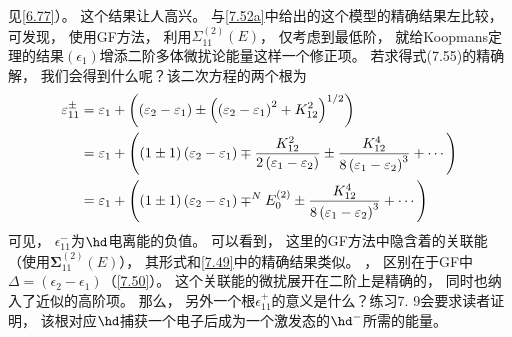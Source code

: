见\autoref{6.77}）。
这个结果让人高兴。
与\autoref{7.52a}中给出的这个模型的精确结果左比较，
可发现，
使用GF方法，
利用$\Sigma_{11}^{(2)}(E)$，
仅考虑到最低阶，
就给Koopmans定理的结果$(\epsilon_1)$增添二阶多体微扰论能量这样一个修正项。
若求得式(7.55)的精确解，
我们会得到什么呢？该二次方程的两个根为
\begin{align}
\varepsilon_{11}^{\pm} &=\varepsilon_{1}+\left(\left(\varepsilon_{2}-\varepsilon_{1}\right) \pm\left(\left(\varepsilon_{2}-\varepsilon_{1}\right)^{2}+K_{12}^{2}\right)^{1 / 2}\right) \notag\\
&=\varepsilon_{1}+\left((1 \pm 1)\left(\varepsilon_{2}-\varepsilon_{1}\right) \mp \frac{K_{12}^{2}}{2\left(\varepsilon_{1}-\varepsilon_{2}\right)} \pm \frac{K_{12}^{4}}{8\left(\varepsilon_{1}-\varepsilon_{2}\right)^{3}}+\cdots\right) \notag\\
	&=\varepsilon_{1}+\left((1 \pm 1)\left(\varepsilon_{2}-\varepsilon_{1}\right) \mp^{N} E_{0}^{(2)} \pm \frac{K_{12}^{4}}{8\left(\varepsilon_{1}-\varepsilon_{2}\right)^{3}}+\cdots\right) \label{7.57}
\end{align}
可见，
$\epsilon_{11}^-$为$\hd$电离能的负值。
可以看到，
这里的GF方法中隐含着的关联能（使用$\mathbf{\Sigma}_{11}^{(2)}(E)$），
其形式和\autoref{7.49}中的精确结果类似。
，
区别在于GF中$\Delta=(\epsilon_{2}-\epsilon_1)$（\autoref{7.50}）。
这个关联能的微扰展开在二阶上是精确的，
同时也纳入了近似的高阶项。
那么，
另外一个根$\epsilon_{11}^+$的意义是什么？练习7.
9会要求读者证明，
该根对应$\hd$捕获一个电子后成为一个激发态的$\hd^-$所需的能量。

